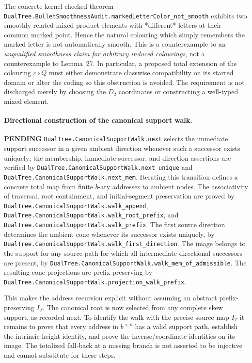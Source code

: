\documentclass[11pt]{article}
\newcommand{\todo}{\textcolor{gray!70!black}{\textbf{PENDING}}}
\newcommand{\lean}[1]{\texttt{#1}}
\begin{document}
The concrete kernel-checked theorem
\lean{DualTree.BulletSmoothnessAudit.markedLetterColor_not_smooth}
exhibits two smoothly related mixed-product elements with
*different* letters at their common marked point.  Hence the natural
colouring which simply remembers the marked letter is not automatically
smooth.  This is a counterexample to an \emph{unqualified smoothness
claim for arbitrary induced colourings}, not a counterexample to
Lemma~27.  In particular, a proposed total extension of the colouring
$c\circ Q$ must either demonstrate classwise compatibility on its
starred domain or alter the coding so this obstruction is avoided.
The requirement is not discharged merely by choosing the $D_2$
coordinates or constructing a well-typed mixed element.


\paragraph{Directional construction of the canonical support walk.} \todo
\lean{DualTree.CanonicalSupportWalk.next} selects the immediate
support successor in a given ambient direction whenever such a
successor exists uniquely; the membership, immediate-successor,
and direction assertions are verified by
\lean{DualTree.CanonicalSupportWalk.next_unique} and
\lean{DualTree.CanonicalSupportWalk.next_mem}.
Iterating this transition defines a concrete total map from finite
$b$-ary addresses to ambient nodes.  The associativity of traversal,
root containment, and initial-segment preservation are proved by
\lean{DualTree.CanonicalSupportWalk.walk_append},
\lean{DualTree.CanonicalSupportWalk.walk_root_prefix}, and
\lean{DualTree.CanonicalSupportWalk.walk_prefix}.
The first source direction determines the ambient cone whenever
its successor exists uniquely, by
\lean{DualTree.CanonicalSupportWalk.walk_first_direction}.
The image belongs to the support for any source path for which all
intermediate directional successors are present, by
\lean{DualTree.CanonicalSupportWalk.walk_mem_of_admissible}.
The resulting cone projections are prefix-preserving by
\lean{DualTree.CanonicalSupportWalk.projection_walk_prefix}.

This makes the address recursion explicit without assuming an
abstract prefix-preserving $I_T$.  The canonical root is now selected
from any complete skew support, as recorded next.  To identify the
walk with the precise source map $I_T$ it remains to prove that
every address in $b^{<k}$ has a valid support path, establish
the intrinsic-height identity, and prove the inverse/coordinate
identities on its image.
The totalized fall-back at a missing branch is not asserted to
be injective and cannot substitute for these steps.
\end{document}
